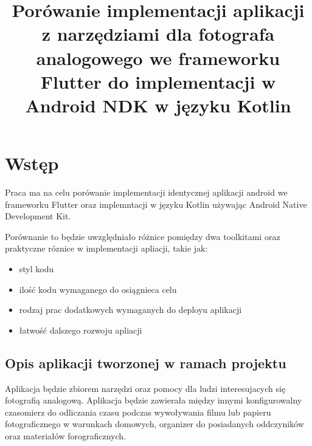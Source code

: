 \documentclass[12pt,a4paper]{article}
\title{Porówanie implementacji aplikacji z narzędziami dla fotografa analogowego we frameworku Flutter do implementacji w Android NDK w języku Kotlin}
\begin{document}
\maketitle

\section{Wstęp}

Praca ma na celu porówanie implementacji identycznej aplikacji android we frameworku Flutter 
oraz implemntacji w języku Kotlin używając Android Native Development Kit.

Porównanie to będzie uwzględniało różnice pomiędzy dwa toolkitami oraz praktyczne róznice w implementacji apliacji, takie jak:
\begin{itemize}
 \item styl kodu
 \item ilość kodu wymaganego do osiągnieca celu
 \item rodzaj prac dodatkowych wymaganych do deployu aplikacji
 \item łatwość dalszego rozwoju apliacji
\end{itemize}

\subsection{Opis aplikacji tworzonej w ramach projektu}

Aplikacja będzie zbiorem narzędzi oraz pomocy dla ludzi interesujacych się fotografią analogową. Aplikacja będzie zawierała między innymi konfigurowalny czasomierz do odliczania czasu
podczas wywoływania filmu lub papieru fotograficznego w warunkach domowych, organizer do posiadanych oddczyników oraz materiałów forograficznych.
\end{document}
